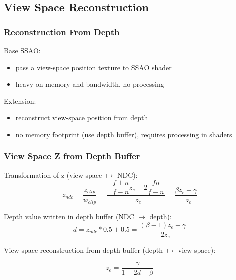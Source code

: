 \documentclass{beamer}
\newcommand{\transform}[1]{$ \xrightarrow{\text{#1}} $}
\newcommand{\redtext}[1]{\textcolor{myred}{#1}}
\begin{document}
\subsection{View Space Reconstruction}
\begin{frame}
\frametitle{Reconstruction From Depth}
Base SSAO:
\begin{itemize}
    \item \redtext{pass} a view-space position texture to SSAO shader
    \item \redtext{heavy on memory} and bandwidth, \redtext{no processing}
\end{itemize}

Extension:
\begin{itemize}
    \item \redtext{reconstruct} view-space position from depth
    \item \redtext{no memory footprint} (use depth buffer), \redtext{requires processing} in shaders
\end{itemize}
\end{frame}

%
%

\begin{frame}
\frametitle{View Space Z from Depth Buffer}
\label{frame:viewspace-from-depth-buffer}

Transformation of z (\redtext{view space $ \mapsto $ NDC}):
\[
z_{ndc} = \dfrac{z_{clip}}{w_{clip}} = \dfrac{-\dfrac{f+n}{f-n} z_e -2 \dfrac{fn}{f-n}}{-z_e} = \dfrac{\beta z_e + \gamma}{-z_e}
\]

Depth value written in depth buffer (\redtext{NDC $ \mapsto $ depth}):
\[
d = z_{ndc} * 0.5 + 0.5 = \dfrac{(\beta - 1) z_e + \gamma}{-2z_e}
\]

View space reconstruction from depth buffer (\redtext{depth $ \mapsto $ view space}):

\[
z_e = \dfrac{\gamma}{1-2d-\beta}
\]
\end{frame}
\end{document}
